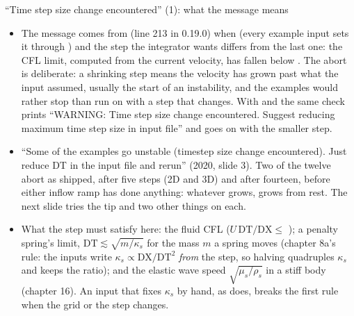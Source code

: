 \documentclass[aspectratio=169,11pt]{beamer}
\begin{document}
\begin{frame}{``Time step size change encountered'' (1): what the message means}
\label{fr:dt}
\footnotesize
\begin{itemize}
  \item The message comes from  (line 213 in 0.19.0) when  (every example input sets it through ) and the step the integrator wants differs from the last one: the CFL limit, computed from the current velocity, has fallen below . The abort is deliberate: a shrinking step means the velocity has grown past what the input assumed, usually the start of an instability, and the examples would rather stop than run on with a step that changes. With  and  the same check prints ``WARNING: Time step size change encountered. Suggest reducing maximum time step size in input file'' and goes on with the smaller step.
  \item ``Some of the examples go unstable (timestep size change encountered). Just reduce DT in the input file and rerun'' (2020, slide 3). Two of the twelve abort as shipped,  after five steps (2D and 3D) and  after fourteen, before either inflow ramp has done anything: whatever grows, grows from rest. The next slide tries the tip and two other things on each.
  \item What the step must satisfy here: the fluid CFL ($U\,\mathrm{DT}/\mathrm{DX} \le$ ); a penalty spring's limit, $\mathrm{DT} \lesssim \sqrt{m/\kappa_s}$ for the mass $m$ a spring moves (chapter 8a's rule: the inputs write $\kappa_s \propto \mathrm{DX}/\mathrm{DT}^2$ \emph{from} the step, so halving  quadruples $\kappa_s$ and keeps the ratio); and the elastic wave speed $\sqrt{\mu_s/\rho_s}$ in a stiff body (chapter 16). An input that fixes $\kappa_s$ by hand, as  does, breaks the first rule when the grid or the step changes.
\end{itemize}
\end{frame}
\end{document}
